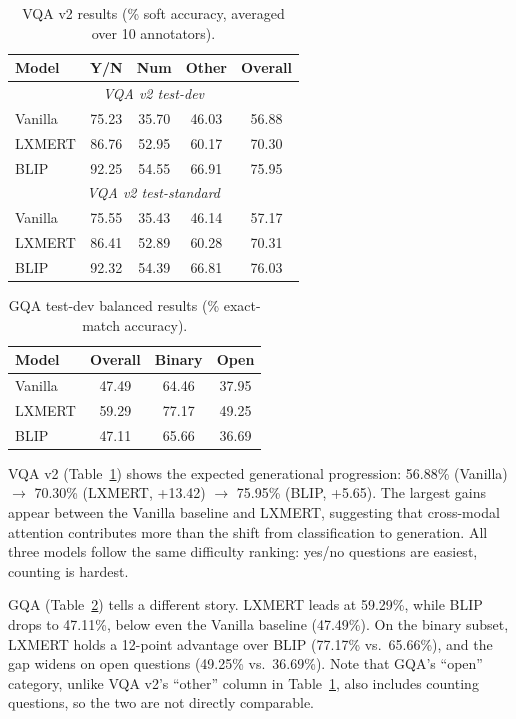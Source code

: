 \begin{table}[t]
\centering
\small
\begin{tabular}{lcccc}
\toprule
\textbf{Model} & \textbf{Y/N} & \textbf{Num} & \textbf{Other} & \textbf{Overall} \\
\midrule
\multicolumn{5}{c}{\textit{VQA v2 test-dev}} \\
\midrule
Vanilla & 75.23 & 35.70 & 46.03 & 56.88 \\
LXMERT & 86.76 & 52.95 & 60.17 & 70.30 \\
BLIP   & 92.25 & 54.55 & 66.91 & 75.95 \\
\midrule
\multicolumn{5}{c}{\textit{VQA v2 test-standard}} \\
\midrule
Vanilla & 75.55 & 35.43 & 46.14 & 57.17 \\
LXMERT & 86.41 & 52.89 & 60.28 & 70.31 \\
BLIP   & 92.32 & 54.39 & 66.81 & 76.03 \\
\bottomrule
\end{tabular}
\caption{VQA v2 results (\% soft accuracy, averaged over 10 annotators).}
\label{tab:vqa_results}
\end{table}

\begin{table}[t]
\centering
\small
\begin{tabular}{lccc}
\toprule
\textbf{Model} & \textbf{Overall} & \textbf{Binary} & \textbf{Open} \\
\midrule
Vanilla & 47.49 & 64.46 & 37.95 \\
LXMERT  & 59.29 & 77.17 & 49.25 \\
BLIP    & 47.11 & 65.66 & 36.69 \\
\bottomrule
\end{tabular}
\caption{GQA test-dev balanced results (\% exact-match accuracy).}
\label{tab:gqa_results}
\end{table}

VQA v2 (Table~\ref{tab:vqa_results}) shows the expected generational progression: 56.88\% (Vanilla) $\rightarrow$ 70.30\% (LXMERT, +13.42) $\rightarrow$ 75.95\% (BLIP, +5.65). The largest gains appear between the Vanilla baseline and LXMERT, suggesting that cross-modal attention contributes more than the shift from classification to generation. All three models follow the same difficulty ranking: yes/no questions are easiest, counting is hardest.

GQA (Table~\ref{tab:gqa_results}) tells a different story. LXMERT leads at 59.29\%, while BLIP drops to 47.11\%, below even the Vanilla baseline (47.49\%). On the binary subset, LXMERT holds a 12-point advantage over BLIP (77.17\% vs.\ 65.66\%), and the gap widens on open questions (49.25\% vs.\ 36.69\%). Note that GQA's ``open'' category, unlike VQA v2's ``other'' column in Table~\ref{tab:vqa_results}, also includes counting questions, so the two are not directly comparable.

